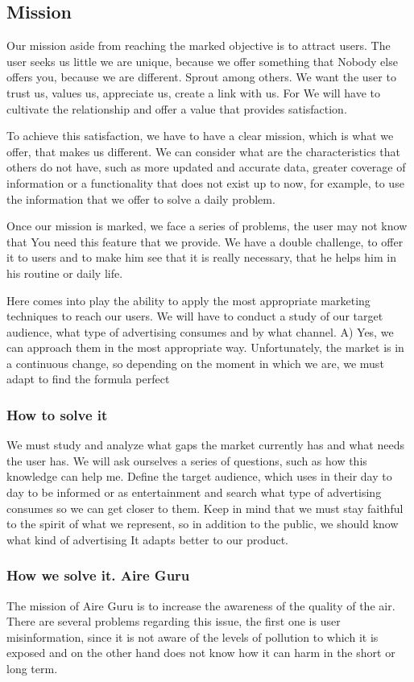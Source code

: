 \subsection{Mission}
Our mission aside from reaching the marked objective is to attract users.
The user seeks us little we are unique, because we offer something that
Nobody else offers you, because we are different. Sprout among others.
We want the user to trust us, values us, appreciate us, create a link with us. For
We will have to cultivate the relationship and offer a value that provides satisfaction.

To achieve this satisfaction, we have to have a clear mission, which is what we offer, that makes us different.
We can consider what are the characteristics that others do not have, such as more updated and accurate data,
greater coverage of information or a functionality that does not exist up to now, for example, to use the
information that we offer to solve a daily problem.

Once our mission is marked, we face a series of problems, the user may not know that
You need this feature that we provide. We have a double challenge, to offer it to users and
to make him see that it is really necessary, that he helps him in his routine or daily life.

Here comes into play the ability to apply the most appropriate marketing techniques to reach our users.
We will have to conduct a study of our target audience, what type of advertising consumes and by what channel. A) Yes,
we can approach them in the most appropriate way. Unfortunately, the market is in a continuous change,
so depending on the moment in which we are, we must adapt to find the formula
perfect

\subsubsection{How to solve it} 
We must study and analyze what gaps the market currently has and what needs the user has.
We will ask ourselves a series of questions, such as how this knowledge can help me.
Define the target audience, which uses in their day to day to be informed or as entertainment and search
what type of advertising consumes so we can get closer to them. Keep in mind that we must stay
faithful to the spirit of what we represent, so in addition to the public, we should know what kind of advertising
It adapts better to our product.
\subsubsection{How we solve it. Aire Guru} 
The mission of Aire Guru is to increase the awareness of the quality of the air.
There are several problems regarding this issue, the first one is user misinformation, since it is not
aware of the levels of pollution to which it is exposed and on the other hand does not know how it can harm
in the short or long term.

